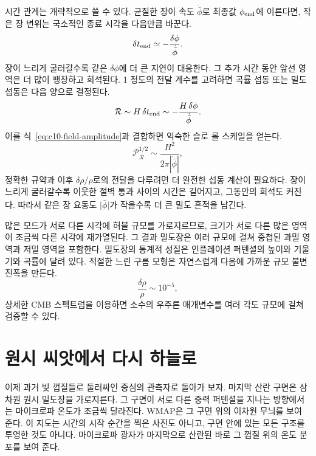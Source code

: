 시간 관계는 개략적으로 쓸 수 있다. 균질한 장이 속도 \(\dot{\bar\phi}\)로 최종값 \(\phi_{\rm end}\)에 이른다면, 작은 장 변위는 국소적인 종료 시각을 다음만큼 바꾼다.
\begin{equation}
\delta t_{\rm end}
\simeq-\frac{\delta\phi}{\dot{\bar\phi}}.
\label{eq:c10-time-delay}
\end{equation}
장이 느리게 굴러갈수록 같은 \(\delta\phi\)에 더 큰 지연이 대응한다. 그 추가 시간 동안 앞선 영역은 더 많이 팽창하고 희석된다. 1 정도의 전달 계수를 고려하면 곡률 섭동 또는 밀도 섭동은 다음 양으로 결정된다.
\begin{equation}
\mathcal R
\sim H\,\delta t_{\rm end}
\sim-\frac{H\,\delta\phi}{\dot{\bar\phi}}.
\label{eq:c10-curvature-estimate}
\end{equation}
이를 식~\eqref{eq:c10-field-amplitude}과 결합하면 익숙한 슬로 롤 스케일을 얻는다.
\begin{equation}
\mathcal P_{\mathcal R}^{1/2}
\sim\frac{H^2}{2\pi|\dot{\bar\phi}|},
\label{eq:c10-slow-roll-amplitude}
\end{equation}
정확한 규약과 이후 \(\delta\rho/\rho\)로의 전달을 다루려면 더 완전한 섭동 계산이 필요하다. 장이 느리게 굴러갈수록 이웃한 절벽 통과 사이의 시간은 길어지고, 그동안의 희석도 커진다. 따라서 같은 장 요동도 \(\lvert\dot{\bar\phi}\rvert\)가 작을수록 더 큰 밀도 흔적을 남긴다.

많은 모드가 서로 다른 시각에 허블 규모를 가로지르므로, 크기가 서로 다른 많은 영역이 조금씩 다른 시각에 재가열된다. 그 결과 밀도장은 여러 규모에 걸쳐 중첩된 과밀 영역과 저밀 영역을 포함한다. 밀도장의 통계적 성질은 인플레이션 퍼텐셜의 높이와 기울기와 곡률에 달려 있다. 적절한 느린 구름 모형은 자연스럽게 다음에 가까운 규모 불변 진폭을 만든다.
\[
\frac{\delta\rho}{\rho}\sim10^{-5},
\]
상세한 CMB 스펙트럼을 이용하면 소수의 우주론 매개변수를 여러 각도 규모에 걸쳐 검증할 수 있다.

\section{원시 씨앗에서 다시 하늘로}

이제 과거 빛 껍질들로 둘러싸인 중심의 관측자로 돌아가 보자. 마지막 산란 구면은 삼차원 원시 밀도장을 가로지른다. 그 구면이 서로 다른 중력 퍼텐셜을 지나는 방향에서는 마이크로파 온도가 조금씩 달라진다. WMAP은 그 구면 위의 이차원 무늬를 보여 준다. 이 지도는 시간의 시작 순간을 찍은 사진도 아니고, 구면 안에 있는 모든 구조를 투영한 것도 아니다. 마이크로파 광자가 마지막으로 산란된 바로 그 껍질 위의 온도 분포를 보여 준다.


